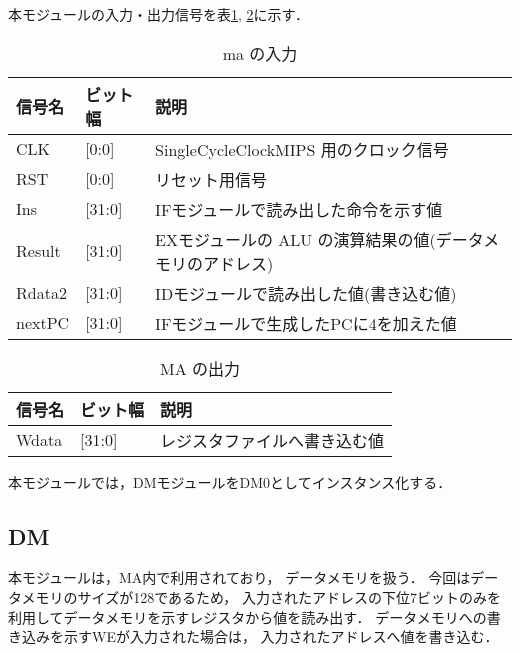 本モジュールの入力・出力信号を表\ref{tab:ma_input}, \ref{tab:ma_output}に示す．
\begin{table}[h]
  \caption{ma の入力}
  \centering
  \begin{tabular}{l|l|l}
    信号名 & ビット幅 & 説明 \\
    \hline
    CLK & [0:0] & SingleCycleClockMIPS 用のクロック信号 \\
    RST & [0:0] & リセット用信号 \\
    Ins & [31:0] & IFモジュールで読み出した命令を示す値 \\
    Result & [31:0] & EXモジュールの ALU の演算結果の値(データメモリのアドレス) \\
    Rdata2 & [31:0] & IDモジュールで読み出した値(書き込む値) \\
    nextPC & [31:0] & IFモジュールで生成したPCに4を加えた値 \\
  \end{tabular}
  \label{tab:ma_input}
\end{table}
\begin{table}[h]
  \caption{MA の出力}
  \centering
  \begin{tabular}{l|l|l}
    信号名 & ビット幅 & 説明 \\
    \hline
    Wdata & [31:0] & レジスタファイルへ書き込む値 \\
  \end{tabular}
  \label{tab:ma_output}
\end{table}

本モジュールでは，DMモジュールをDM0としてインスタンス化する．

\subsection{DM}
本モジュールは，MA内で利用されており，
データメモリを扱う．
今回はデータメモリのサイズが128であるため，
入力されたアドレスの下位7ビットのみを利用してデータメモリを示すレジスタから値を読み出す．
データメモリへの書き込みを示すWEが入力された場合は，
入力されたアドレスへ値を書き込む．

